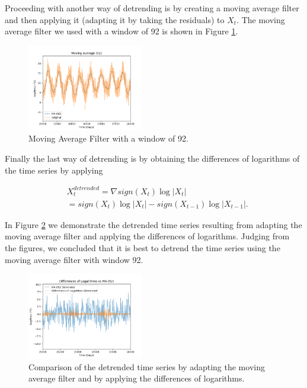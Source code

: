 \documentclass[conference]{IEEEtran}
\begin{document}
Proceeding with another way of detrending is by creating a moving average filter and then applying it (adapting it by taking the residuals) to $X_t$. The moving average filter we used with a window of 92 is shown in Figure \ref{airma}.
\vspace{20mm}

\begin{figure}[ht]
    \centering
    \includegraphics[width=0.45\textwidth]{Figures/Moving Average (92).png}
    \caption{Moving Average Filter with a window of 92.}
    \label{airma}
\end{figure}

Finally the last way of detrending is by obtaining the differences of logarithms of the time series by applying

\begin{equation}\label{diflog}
    \begin{split}
        & X_t^{detrended} = \nabla sign(X_t)\log|X_t| \\
        & = sign(X_t)\log|X_t|-sign(X_{t-1})\log|X_{t-1}|.
    \end{split}
\end{equation}

In Figure \ref{airfdvsma} we demonstrate the detrended time series resulting from adapting the moving average filter and applying the differences of logarithms. Judging from the figures, we concluded that it is best to detrend the time series using the moving average filter with window 92. 

\begin{figure}[ht]
    \centering
    \includegraphics[width=0.45\textwidth]{Figures/Differences of Logarithms vs MA (92).png}
    \caption{Comparison of the detrended time series by adapting the moving average filter and by applying the differences of logarithms.}
    \label{airfdvsma}
\end{figure}
\end{document}
